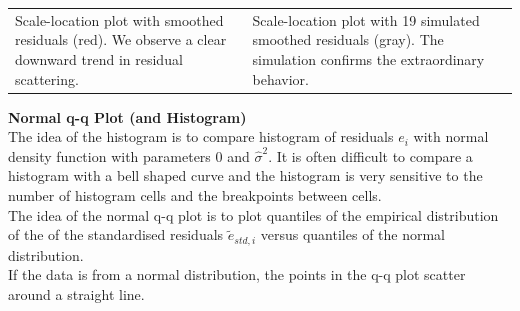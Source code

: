 \begin{table}[H]
\begin{tabular}{p{}@{\hskip 1em}p{}}
    Scale-location plot with smoothed residuals (red). We observe a clear downward trend in residual scattering. &
    Scale-location plot with 19 simulated smoothed residuals (gray). The simulation confirms the extraordinary behavior.\\
  \end{tabular}
\end{table}

\textbf{Normal q-q Plot (and Histogram)}\\
The idea of the histogram is to compare histogram of residuals $e_i$ with normal density function with parameters $0$ and $\hat{\sigma}^2$. It is often difficult to compare a histogram with a bell shaped curve and the histogram is very sensitive to the number of histogram cells and the breakpoints between cells.\\
The idea of the normal q-q plot is to plot quantiles of the empirical distribution of the of the standardised residuals $\tilde{e}_{std, i}$ versus quantiles of the normal distribution.\\
If the data is from a normal distribution, the points in the q-q plot scatter around a straight line.


